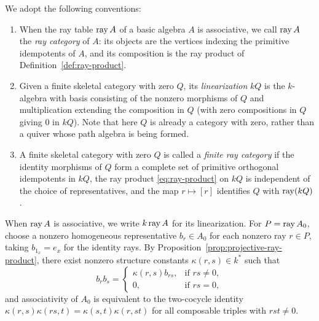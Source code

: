 \begin{definition}
\label{def:finite-ray-category}
We adopt the following conventions:
\begin{enumerate}[label={\upshape(\arabic*)}]
\item When the ray table $\operatorname{ray} A$ of a basic algebra $A$ is associative, we
call $\operatorname{ray} A$ the \emph{ray category} of $A$: its objects are the vertices
indexing the primitive idempotents of $A$, and its composition is the ray
product of Definition~\ref{def:ray-product}.
\item Given a finite skeletal category with zero $Q$, its
\emph{linearization} $kQ$ is the $k$-algebra with basis consisting of the
nonzero morphisms of $Q$ and multiplication extending the composition in $Q$
(with zero compositions in $Q$ giving $0$ in $kQ$). Note that here $Q$ is
already a category with zero, rather than a quiver whose path algebra is
being formed.
\item A finite skeletal category with zero $Q$ is called a \emph{finite ray
category} if the identity morphisms of $Q$ form a complete set of primitive
orthogonal idempotents in $kQ$, the ray product \eqref{eq:ray-product} on
$kQ$ is independent of the choice of representatives, and the map
$r\mapsto[r]$ identifies $Q$ with $\operatorname{ray}(kQ)$.
\end{enumerate}
\end{definition}

When $\operatorname{ray} A$ is associative, we write $k\operatorname{ray} A$ for its linearization. For
$P=\operatorname{ray} A_0$, choose a nonzero homogeneous representative $b_r\in A_0$ for
each nonzero ray $r\in P$, taking $b_{1_x}=e_x$ for the identity rays. By
Proposition~\ref{prop:projective-ray-product}, there exist nonzero structure
constants $\kappa(r,s)\in k^*$ such that
\begin{equation}
 b_rb_s=\begin{cases}\kappa(r,s)b_{rs},&\text{if }rs\ne0,\\0,&\text{if }rs=0,\end{cases}
 \label{eq:projective-scalars}
\end{equation}
and associativity of $A_0$ is equivalent to the two-cocycle identity
$\kappa(r,s)\kappa(rs,t)=\kappa(s,t)\kappa(r,st)$ for all composable triples
with $rst\ne0$.
